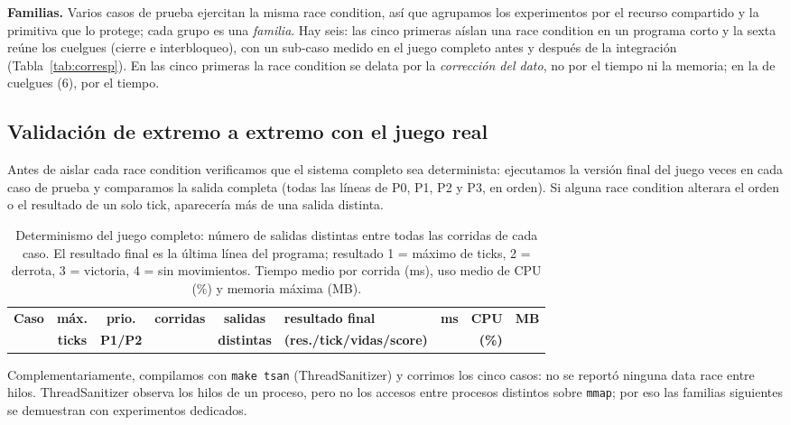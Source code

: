 \documentclass[11pt,a4paper]{article}
\newcommand{\cod}[1]{\texttt{#1}}
\renewcommand{\_}{\textunderscore\allowbreak}
\begin{document}
\textbf{Familias.} Varios casos de prueba ejercitan la misma race condition, así que agrupamos los experimentos por el recurso compartido y la primitiva que lo protege; cada grupo es una \emph{familia}. Hay seis: las cinco primeras aíslan una race condition en un programa corto y la sexta reúne los cuelgues (cierre e interbloqueo), con un sub-caso medido en el juego completo antes y después de la integración (Tabla~\ref{tab:corresp}). En las cinco primeras la race condition se delata por la \emph{corrección del dato}, no por el tiempo ni la memoria; en la de cuelgues (6), por el tiempo.

\subsection{Validación de extremo a extremo con el juego real}

Antes de aislar cada race condition verificamos que el sistema completo sea determinista: ejecutamos la versión final del juego \NjuegoN{} veces en cada caso de prueba y comparamos la salida completa (todas las líneas de P0, P1, P2 y P3, en orden). Si alguna race condition alterara el orden o el resultado de un solo tick, aparecería más de una salida distinta.

\begin{table}[H]
\centering\small
\setlength{\tabcolsep}{5pt}
\begin{tabular}{@{}lcccclrrr@{}}
\toprule
\textbf{Caso} & \textbf{máx.} & \textbf{prio.} & \textbf{corridas} & \textbf{salidas} & \textbf{resultado final} & \textbf{ms} & \textbf{CPU} & \textbf{MB}\\
 & \textbf{ticks} & \textbf{P1/P2} & & \textbf{distintas} & \textbf{(res./tick/vidas/score)} & & \textbf{(\%)} & \\
\midrule

\end{tabular}
\caption{Determinismo del juego completo: número de salidas distintas entre todas las corridas de cada caso. El resultado final es la última línea del programa; resultado 1 = máximo de ticks, 2 = derrota, 3 = victoria, 4 = sin movimientos. Tiempo medio por corrida (ms), uso medio de CPU (\%) y memoria máxima (MB).}
\label{tab:juego}
\end{table}

\NJuegoTexto

Complementariamente, compilamos con \cod{make tsan} (ThreadSanitizer) y corrimos los cinco casos: no se reportó ninguna data race entre hilos. ThreadSanitizer observa los hilos de un proceso, pero no los accesos entre procesos distintos sobre \cod{mmap}; por eso las familias siguientes se demuestran con experimentos dedicados.
\end{document}
